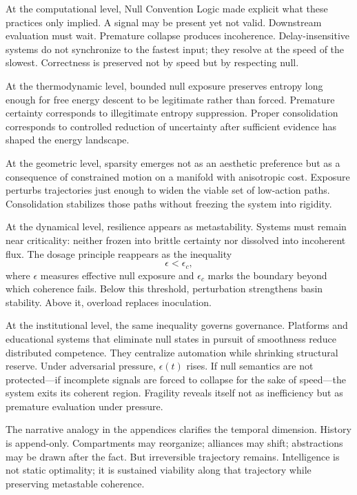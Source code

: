 \documentclass[12pt]{article}
\begin{document}
At the computational level, Null Convention Logic made explicit what these practices only implied. A signal may be present yet not valid. Downstream evaluation must wait. Premature collapse produces incoherence. Delay-insensitive systems do not synchronize to the fastest input; they resolve at the speed of the slowest. Correctness is preserved not by speed but by respecting null.

At the thermodynamic level, bounded null exposure preserves entropy long enough for free energy descent to be legitimate rather than forced. Premature certainty corresponds to illegitimate entropy suppression. Proper consolidation corresponds to controlled reduction of uncertainty after sufficient evidence has shaped the energy landscape.

At the geometric level, sparsity emerges not as an aesthetic preference but as a consequence of constrained motion on a manifold with anisotropic cost. Exposure perturbs trajectories just enough to widen the viable set of low-action paths. Consolidation stabilizes those paths without freezing the system into rigidity.

At the dynamical level, resilience appears as metastability. Systems must remain near criticality: neither frozen into brittle certainty nor dissolved into incoherent flux. The dosage principle reappears as the inequality
\[
\epsilon < \epsilon_c,
\]
where $\epsilon$ measures effective null exposure and $\epsilon_c$ marks the boundary beyond which coherence fails. Below this threshold, perturbation strengthens basin stability. Above it, overload replaces inoculation.

At the institutional level, the same inequality governs governance. Platforms and educational systems that eliminate null states in pursuit of smoothness reduce distributed competence. They centralize automation while shrinking structural reserve. Under adversarial pressure, $\epsilon(t)$ rises. If null semantics are not protected—if incomplete signals are forced to collapse for the sake of speed—the system exits its coherent region. Fragility reveals itself not as inefficiency but as premature evaluation under pressure.

The narrative analogy in the appendices clarifies the temporal dimension. History is append-only. Compartments may reorganize; alliances may shift; abstractions may be drawn after the fact. But irreversible trajectory remains. Intelligence is not static optimality; it is sustained viability along that trajectory while preserving metastable coherence.
\end{document}

